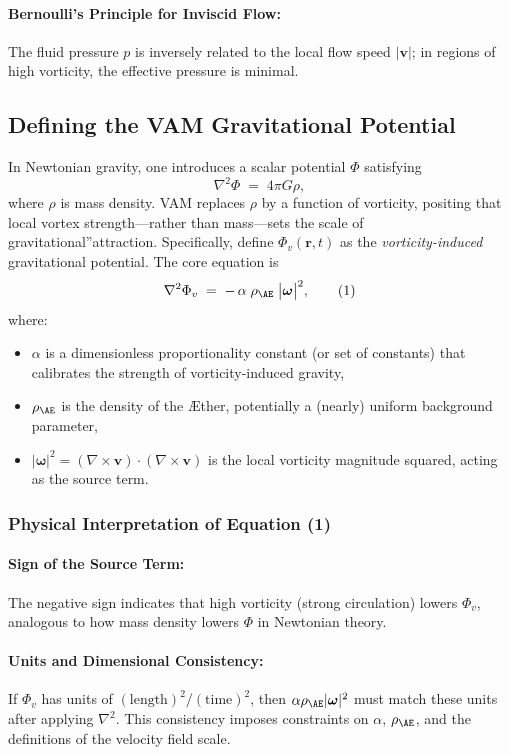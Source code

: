 \documentclass[a4paper,12pt]{article}
\begin{document}
\paragraph{Bernoulli's Principle for Inviscid Flow:}
The fluid pressure \(p\) is inversely related to the local flow speed \(\lvert \mathbf{v} \rvert\); in regions of high vorticity, the effective pressure is minimal.

\subsection{Defining the VAM Gravitational Potential}
In Newtonian gravity, one introduces a scalar potential \(\Phi\) satisfying
\[
    \nabla^2 \Phi \;=\; 4 \pi G \rho,
\]
where \(\rho\) is mass density. VAM replaces \(\rho\) by a function of vorticity, positing that local vortex strength—rather than mass—sets the scale of \grqq gravitational\textquotedblright attraction. Specifically, define \(\Phi_v(\mathbf{r},t)\) as the \textit{vorticity-induced} gravitational potential. The core equation is
\[
    \nabla^2 \Phi_v \;=\; -\,\alpha \;\rho_{\mathrm{\AE}}\;\bigl|\boldsymbol{\omega}\bigr|^2,
    \tag{1}
\]
where:
\begin{itemize}
    \item \(\alpha\) is a dimensionless proportionality constant (or set of constants) that calibrates the strength of vorticity-induced gravity,
    \item \(\rho_{\mathrm{\AE}}\) is the density of the Æther, potentially a (nearly) uniform background parameter,
    \item \(\lvert \boldsymbol{\omega} \rvert^2 = (\nabla \times \mathbf{v})\cdot(\nabla \times \mathbf{v})\) is the local vorticity magnitude squared, acting as the source term.
\end{itemize}

\subsubsection{Physical Interpretation of Equation (1)}

\paragraph{Sign of the Source Term:} The negative sign indicates that high vorticity (strong circulation) lowers \(\Phi_v\), analogous to how mass density lowers \(\Phi\) in Newtonian theory.

\paragraph{Units and Dimensional Consistency:} If \(\Phi_v\) has units of \((\text{length})^2/(\text{time})^2\), then \(\alpha \rho_{\mathrm{\AE}} \lvert \boldsymbol{\omega} \rvert^2\) must match these units after applying \(\nabla^2\). This consistency imposes constraints on \(\alpha\), \(\rho_{\mathrm{\AE}}\), and the definitions of the velocity field scale.
\end{document}
